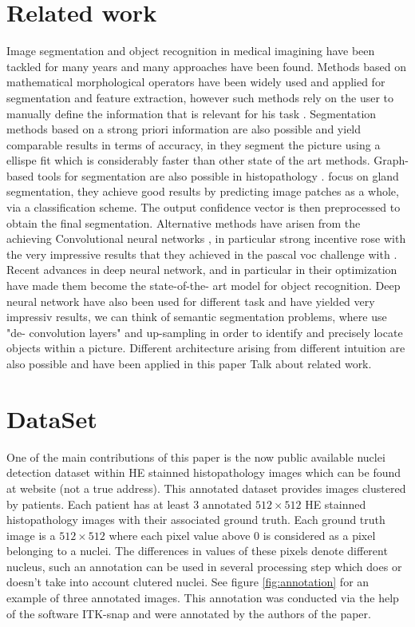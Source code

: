 \documentclass{article}
\begin{document}
\section{Related work}
\label{sec:related}
Image segmentation and object recognition in medical imagining have 
been tackled for many years and many approaches have been found. 
Methods based on mathematical morphological operators have been 
widely used and applied for segmentation and feature extraction, 
however such methods rely on the user to manually define the 
information that is relevant for his task \cite{irshad2014methods}. 
Segmentation methods based on a strong priori information are also 
possible and yield comparable results in terms of accuracy, in 
\cite{ranefall2016fast} they segment the picture using a ellispe fit 
which is considerably faster than other state of the art methods. Graph-
based tools for segmentation are also possible in histopathology 
\cite{ta2009graph}. \cite{manivannanlocal} focus on gland 
segmentation, they achieve good results by predicting image patches as 
a whole, via a classification scheme. The output confidence vector is 
then preprocessed to obtain the final segmentation. Alternative methods 
have arisen from the achieving Convolutional neural networks 
\cite{lecun}, in particular strong incentive rose with the very impressive 
results that they achieved in the pascal voc challenge with 
\cite{ImageNet}. Recent advances in deep neural network, and in 
particular in their optimization have made them become the state-of-the-
art model for object recognition.  Deep neural network have also been 
used for different task and have yielded very impressiv results, we can think of 
semantic segmentation problems, where \cite{long2015fcn} use "de-
convolution layers" and up-sampling in order to identify and precisely 
locate objects within a picture. Different architecture arising from 
different intuition are also possible and have been applied in this paper
Talk about related work.

\section{DataSet}
\label{sec:dataset}

One of the main contributions of this paper is the now public available 
nuclei detection dataset within HE stainned histopathology images which 
can be found at website %
(not a true address). This annotated dataset provides images clustered by 
patients. Each patient has at least 3 annotated $512 \times 512$ HE 
stainned histopathology images with their associated ground truth. Each 
ground truth image is a $512 \times 512$ where each pixel value above 
$0$ is considered as a pixel belonging to a nuclei. The differences in 
values of these pixels denote different nucleus, such an annotation can 
be used in several processing step which does or doesn't take into 
account clutered nuclei. See figure \ref{fig:annotation} for an example of 
three annotated images. This annotation was conducted via the help of 
the software ITK-snap and were annotated by the authors of the paper.
\end{document}
